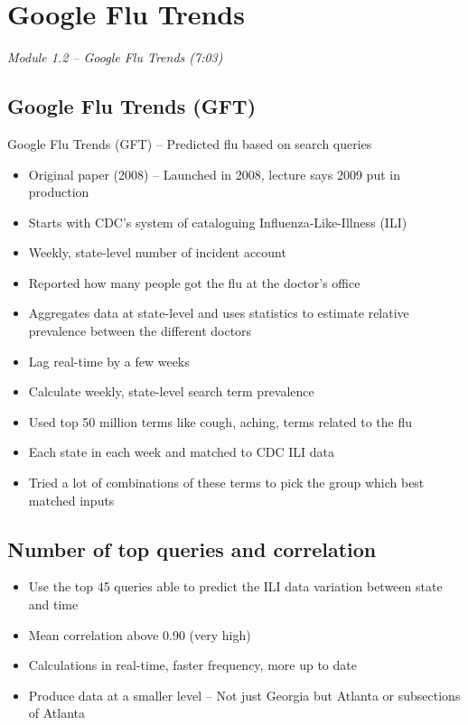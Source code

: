\documentclass[
]{book}
\providecommand{\tightlist}{%
  \setlength{\itemsep}{0pt}\setlength{\parskip}{0pt}}
\begin{document}
\section{Google Flu Trends}\label{google-flu-trends}

\emph{Module 1.2 -- Google Flu Trends (7:03)}

\subsection{Google Flu Trends (GFT)}\label{google-flu-trends-gft}

Google Flu Trends (GFT) -- Predicted flu based on search queries

\begin{itemize}
\tightlist
\item
  Original paper (2008) -- Launched in 2008, lecture says 2009 put in production
\item
  Starts with CDC's system of cataloguing Influenza-Like-Illness (ILI)
\item
  Weekly, state-level number of incident account
\item
  Reported how many people got the flu at the doctor's office
\item
  Aggregates data at state-level and uses statistics to estimate relative prevalence between the different doctors
\item
  Lag real-time by a few weeks
\item
  Calculate weekly, state-level search term prevalence
\item
  Used top 50 million terms like cough, aching, terms related to the flu
\item
  Each state in each week and matched to CDC ILI data
\item
  Tried a lot of combinations of these terms to pick the group which best matched inputs
\end{itemize}

\subsection{Number of top queries and correlation}\label{number-of-top-queries-and-correlation}

\begin{itemize}
\tightlist
\item
  Use the top 45 queries able to predict the ILI data variation between state and time
\item
  Mean correlation above 0.90 (very high)
\item
  Calculations in real-time, faster frequency, more up to date
\item
  Produce data at a smaller level -- Not just Georgia but Atlanta or subsections of Atlanta
\end{itemize}
\end{document}
